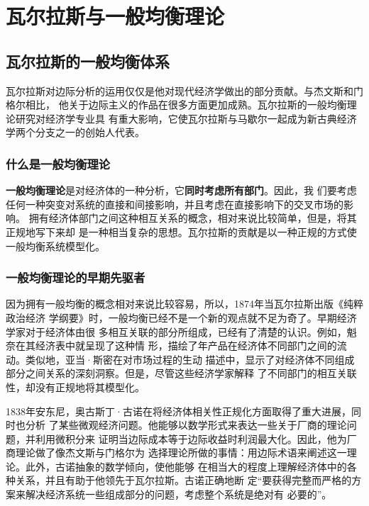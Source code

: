 \chapter{瓦尔拉斯与一般均衡理论}

\section{瓦尔拉斯的一般均衡体系}

瓦尔拉斯对边际分析的运用仅仅是他对现代经济学做出的部分贡献。与杰文斯和门格尔相比，
他关于边际主义的作品在很多方面更加成熟。瓦尔拉斯的一般均衡理论研究对经济学专业具
有重大影响，它使瓦尔拉斯与马歇尔一起成为新古典经济学两个分支之一的创始人代表。

\subsection{什么是一般均衡理论}

\textbf{一般均衡理论}是对经济体的一种分析，它\textbf{同时考虑所有部门}。因此，我
们要考虑任何一种突变对系统的直接和间接影响，并且考虑在直接影响下的交叉市场的影响。
拥有经济体部门之间这种相互关系的概念，相对来说比较简单，但是，将其正规地写下来却
是一种相当复杂的思想。瓦尔拉斯的贡献是以一种正规的方式使一般均衡系统模型化。

\subsection{一般均衡理论的早期先驱者}

因为拥有一般均衡的概念相对来说比较容易，所以，1874年当瓦尔拉斯出版《纯粹政治经济
学纲要》时，一般均衡已经不是一个新的观点就不足为奇了。早期经济学家对于经济体由很
多相互关联的部分所组成，已经有了清楚的认识。例如，魁奈在其经济表中就呈现了这种情
形，描绘了年产品在经济体不同部门之间的流动。类似地，亚当·斯密在对市场过程的生动
描述中，显示了对经济体不同组成部分之间关系的深刻洞察。但是，尽管这些经济学家解释
了不同部门的相互关联性，却没有正规地将其模型化。

1838年安东尼，奥古斯丁·古诺在将经济体相关性正规化方面取得了重大进展，同时也分析
了某些微观经济问题。他能够以数学形式来表达一些关于厂商的理论问题，并利用微积分来
证明当边际成本等于边际收益时利润最大化。因此，他为厂商理论做了像杰文斯与门格尔为
选择理论所做的事情：用边际术语来阐述这一理论。此外，古诺抽象的数学倾向，使他能够
在相当大的程度上理解经济体中的各种关系，并且有助于他领先于瓦尔拉斯。古诺正确地断
定“要获得完整而严格的方案来解决经济系统一些组成部分的问题，考虑整个系统是绝对有
必要的”。

